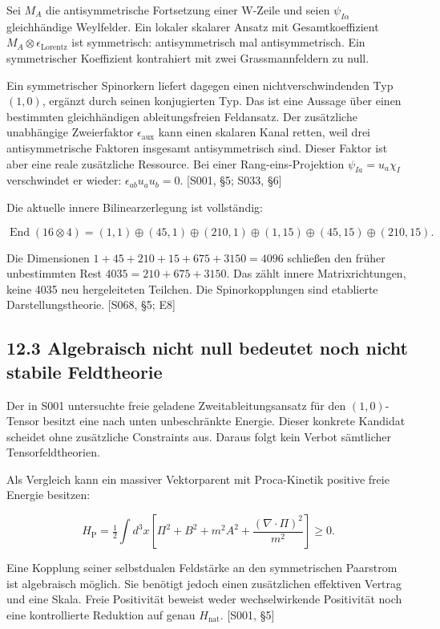 Sei \(M_A\) die antisymmetrische Fortsetzung einer W-Zeile und seien
\(\psi_{I\alpha}\) gleichhändige Weylfelder. Ein lokaler skalarer Ansatz
mit Gesamtkoeffizient \(M_A\otimes\epsilon_{\mathrm{Lorentz}}\) ist
symmetrisch: antisymmetrisch mal antisymmetrisch. Ein symmetrischer
Koeffizient kontrahiert mit zwei Grassmannfeldern zu null.

Ein symmetrischer Spinorkern liefert dagegen einen nichtverschwindenden
Typ \((1,0)\), ergänzt durch seinen konjugierten Typ. Das ist eine
Aussage über einen bestimmten gleichhändigen ableitungsfreien
Feldansatz. Der zusätzliche unabhängige Zweierfaktor
\(\epsilon_{\mathrm{aux}}\) kann einen skalaren Kanal retten, weil drei
antisymmetrische Faktoren insgesamt antisymmetrisch sind. Dieser Faktor
ist aber eine reale zusätzliche Ressource. Bei einer
Rang-eins-Projektion \(\psi_{Ia}=u_a\chi_I\) verschwindet er wieder:
\(\epsilon_{ab}u_au_b=0\). {[}S001, §5; S033, §6{]}

Die aktuelle innere Bilinearzerlegung ist vollständig:

\[\operatorname{End}(16\otimes4)
=(1,1)\oplus(45,1)\oplus(210,1)
\oplus(1,15)\oplus(45,15)\oplus(210,15).\]

Die Dimensionen \(1+45+210+15+675+3150=4096\) schließen den früher
unbestimmten Rest \(4035=210+675+3150\). Das zählt innere
Matrixrichtungen, keine 4035 neu hergeleiteten Teilchen. Die
Spinorkopplungen sind etablierte Darstellungstheorie. {[}S068, §5; E8{]}

\subsection{12.3 Algebraisch nicht null bedeutet noch nicht stabile
Feldtheorie}\label{algebraisch-nicht-null-bedeutet-noch-nicht-stabile-feldtheorie}

Der in S001 untersuchte freie geladene Zweitableitungsansatz für den
\((1,0)\)-Tensor besitzt eine nach unten unbeschränkte Energie. Dieser
konkrete Kandidat scheidet ohne zusätzliche Constraints aus. Daraus
folgt kein Verbot sämtlicher Tensorfeldtheorien.

Als Vergleich kann ein massiver Vektorparent mit Proca-Kinetik positive
freie Energie besitzen:

\[H_{\mathrm P}=\tfrac12\int d^3x\left[
\Pi^2+B^2+m^2A^2+\frac{(\nabla\cdot\Pi)^2}{m^2}\right]\ge0.\]

Eine Kopplung seiner selbstdualen Feldstärke an den symmetrischen
Paarstrom ist algebraisch möglich. Sie benötigt jedoch einen
zusätzlichen effektiven Vertrag und eine Skala. Freie Positivität
beweist weder wechselwirkende Positivität noch eine kontrollierte
Reduktion auf genau \(H_{\mathrm{nat}}\). {[}S001, §5{]}

